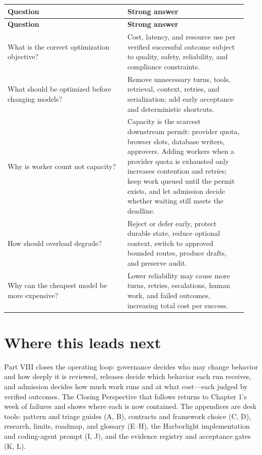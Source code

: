 \BookTableStart
\small
\begin{longtable}{@{}Y{0.4700\linewidth}Y{0.4700\linewidth}@{}}
\color{white}\bfseries \textbf{Question} & \color{white}\bfseries \textbf{Strong answer} \\
\endfirsthead
{}
\color{white}\bfseries \textbf{Question} & \color{white}\bfseries \textbf{Strong answer} \\
\endhead
What is the correct optimization objective? & Cost, latency, and resource use per verified successful outcome subject to quality, safety, reliability, and compliance constraints. \\
What should be optimized before changing models? & Remove unnecessary turns, tools, retrieval, context, retries, and serialization; add early acceptance and deterministic shortcuts. \\
Why is worker count not capacity? & Capacity is the scarcest downstream permit: provider quota, browser slots, database writers, approvers. Adding workers when a provider quota is exhausted only increases contention and retries; keep work queued until the permit exists, and let admission decide whether waiting still meets the deadline. \\
How should overload degrade? & Reject or defer early, protect durable state, reduce optional context, switch to approved bounded routes, produce drafts, and preserve audit. \\
Why can the cheapest model be more expensive? & Lower reliability may cause more turns, retries, escalations, human work, and failed outcomes, increasing total cost per success. \\
\end{longtable}
\BookTableEnd

\section{Where this leads next}

Part VIII closes the operating loop: governance decides who may change behavior and how deeply it is reviewed, releases decide which behavior each run receives, and admission decides how much work runs and at what cost—each judged by verified outcomes. The Closing Perspective that follows returns to Chapter 1's week of failures and shows where each is now contained. The appendices are desk tools: pattern and triage guides (A, B), contracts and framework choice (C, D), research, limits, roadmap, and glossary (E–H), the Harborlight implementation and coding-agent prompt (I, J), and the evidence registry and acceptance gates (K, L).\par

